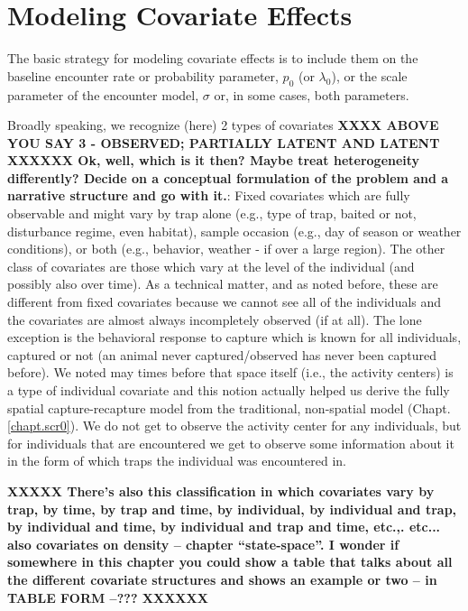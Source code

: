\section{Modeling Covariate Effects}

The basic strategy for modeling covariate effects is to include them
on the baseline encounter rate or probability parameter, $p_{0}$ (or
$\lambda_{0}$), or the scale parameter of the encounter model,
$\sigma$ or, in some cases, both parameters.

Broadly speaking, we recognize (here) 2 types of covariates {\bf XXXX ABOVE
YOU SAY 3 - OBSERVED; PARTIALLY LATENT AND LATENT XXXXXX Ok, well,
which is it then? Maybe treat heterogeneity differently? Decide on a
conceptual formulation of the problem and a narrative structure and
go with it.}: Fixed
covariates which are fully observable and might vary by trap alone
(e.g., type of trap, baited or not, disturbance regime, even habitat),
sample occasion (e.g., day of season or weather conditions), or both
(e.g., behavior, weather - if over a large region).  The other class
of covariates are those which vary at the level of the individual (and
possibly also over time).  As a technical matter, and as noted before,
these are different from fixed covariates because we cannot see all of
the individuals and the covariates are almost always incompletely
observed (if at all).  The lone exception is the behavioral response
to capture which is known for all individuals, captured or not (an
animal never captured/observed has never been captured before).  We
noted may times before that space itself (i.e., the activity centers)
is a type of individual covariate and this notion actually helped us
derive the fully spatial capture-recapture model from the traditional,
non-spatial model (Chapt. \ref{chapt.scr0}). We do not get to observe
the activity center for any individuals, but for individuals that are
encountered we get to observe some information about it in the form of
which traps the individual was encountered in.


{\bf XXXXX There's also this classification in which covariates vary
  by trap, by time, by trap and time, by individual, by individual and
  trap, by individual and time, by individual and trap and time,
  etc.,. etc... also covariates on density -- chapter
  ``state-space''.  I wonder if somewhere in this chapter you could
  show a table that talks about all the different covariate structures
  and shows an example or two -- in TABLE FORM --??? 
XXXXXX}


